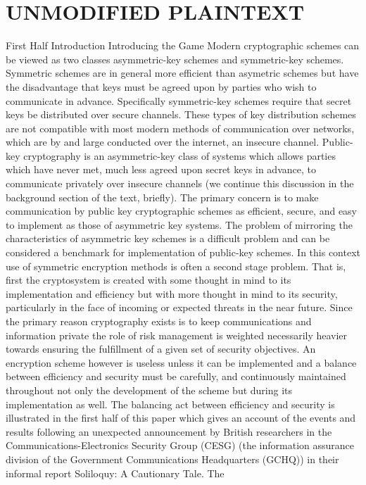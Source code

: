 \section{UNMODIFIED PLAINTEXT}
First Half Introduction Introducing the Game Modern cryptographic
schemes can be viewed as two classes asymmetric-key schemes and
symmetric-key schemes. Symmetric schemes are in general more efficient
than asymetric schemes but have the disadvantage that keys must be
agreed upon by parties who wish to communicate in advance. Specifically
symmetric-key schemes require that secret keys be distributed over
secure channels. These types of key distribution schemes are not
compatible with most modern methods of communication over networks,
which are by and large conducted over the internet, an insecure
channel. Public-key cryptography is an asymmetric-key class of systems
which allows parties which have never met, much less agreed upon secret
keys in advance, to communicate privately over insecure channels (we
continue this discussion in the background section of the text,
briefly). The primary concern is to make communication by public key
cryptographic schemes as efficient, secure, and easy to implement as
those of asymmetric key systems. The problem of mirroring the
characteristics of asymmetric key schemes is a difficult problem and
can be considered a benchmark for implementation of public-key schemes.
In this context use of symmetric encryption methods is often a second
stage problem. That is, first the cryptosystem is created with some
thought in mind to its implementation and efficiency but with more
thought in mind to its security, particularly in the face of incoming
or expected threats in the near future. Since the primary reason
cryptography exists is to keep communications and information private
the role of risk management is weighted necessarily heavier towards
ensuring the fulfillment of a given set of security objectives. An
encryption scheme however is useless unless it can be implemented and a
balance between efficiency and security must be carefully, and
continuously maintained throughout not only the development of the
scheme but during its implementation as well. The balancing act between
efficiency and security is illustrated in the first half of this paper
which gives an account of the events and results following an
unexpected announcement by British researchers in the
Communications-Electronics Security Group (CESG) (the information
assurance division of the Government Communications Headquarters
(GCHQ)) in their informal report Soliloquy: A Cautionary Tale. The
